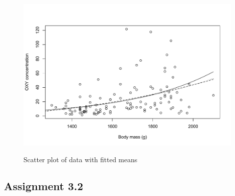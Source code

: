 \documentclass[12pt]{article}
\begin{document}
\begin{enumerate}
    \begin{figure}[h]
      \caption{Scatter plot of data with fitted means}
      \centering
      \includegraphics[width=.8\textwidth]{./figures/hw03_fitted.pdf}
      \label{fig:3}
    \end{figure}
\end{enumerate}



\subsection*{Assignment 3.2}
\end{document}
